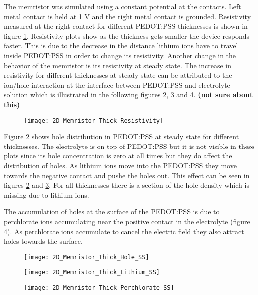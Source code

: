 The memristor was simulated using a constant potential at the contacts. Left metal contact is held at 1 V and the right metal contact is grounded. Resistivity measured at the right contact for different PEDOT:PSS thicknesses is shown in figure \ref{thick_resistivity}. Resistivity plots show as the thickness gets smaller the device responds faster. This is due to the decrease in the distance lithium ions have to travel inside PEDOT:PSS in order to change its resistivity. Another change in the behavior of the memristor is its resistivity at steady state. The increase in resistivity for different thicknesses at steady state can be attributed to the ion/hole interaction at the interface between PEDOT:PSS and electrolyte solution which is illustrated in the following figures \ref{thick_p_ss}, \ref{thick_li_ss} and \ref{thick_perch_ss}. \textbf{(not sure about this)}

\begin{figure}[!htp]
\centering
\texttt{[image: 2D\_Memristor\_Thick\_Resistivity]}
\caption{} 
\label{thick_resistivity}
\end{figure}

Figure \ref{thick_p_ss} shows hole distribution in PEDOT:PSS at steady state for different thicknesses. The electrolyte is on top of PEDOT:PSS but it is not visible in these plots since its hole concentration is zero at all times but they do affect the distribution of holes. As lithium ions move into the PEDOT:PSS they move towards the negative contact and pushe the holes out. This effect can be seen in figures \ref{thick_p_ss} and  \ref{thick_li_ss}. For all thicknesses there is a section of the hole density which is missing due to lithium ions.

The accumulation of holes at the surface of the PEDOT:PSS is due to perchlorate ions accumulating near the positive contact in the electrolyte (figure \ref{thick_perch_ss}). As perchlorate ions accumulate to cancel the electric field they also attract holes towards the surface.
\begin{figure}[!htp]
\centering
\texttt{[image: 2D\_Memristor\_Thick\_Hole\_SS]}
\caption{} 
\label{thick_p_ss}
\end{figure}

\begin{figure}[!htp]
\centering
\texttt{[image: 2D\_Memristor\_Thick\_Lithium\_SS]}
\caption{} 
\label{thick_li_ss}
\end{figure}

\begin{figure}[!htp]
\centering
\texttt{[image: 2D\_Memristor\_Thick\_Perchlorate\_SS]}
\caption{} 
\label{thick_perch_ss}
\end{figure}

